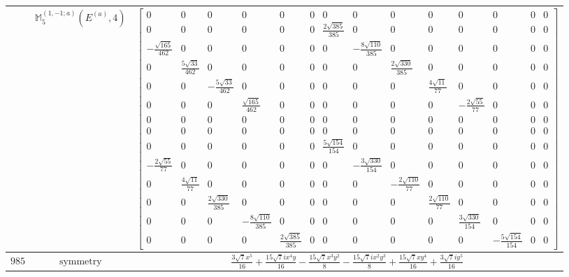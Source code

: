 \documentclass[fleqn,8pt,landscape]{jsarticle}
\begin{document}
\begin{longtable}{ccc}
$  $ & $ \mathbb{M}_{5}^{(1,-1;a)}(E^{(a)},4) $ & $ \begin{bmatrix} 0 & 0 & 0 & 0 & 0 & 0 & 0 & 0 & 0 & 0 & 0 & 0 & 0 & 0 \\ 0 & 0 & 0 & 0 & 0 & 0 & \frac{2 \sqrt{385}}{385} & 0 & 0 & 0 & 0 & 0 & 0 & 0 \\ - \frac{\sqrt{165}}{462} & 0 & 0 & 0 & 0 & 0 & 0 & - \frac{8 \sqrt{110}}{385} & 0 & 0 & 0 & 0 & 0 & 0 \\ 0 & \frac{5 \sqrt{33}}{462} & 0 & 0 & 0 & 0 & 0 & 0 & \frac{2 \sqrt{330}}{385} & 0 & 0 & 0 & 0 & 0 \\ 0 & 0 & - \frac{5 \sqrt{33}}{462} & 0 & 0 & 0 & 0 & 0 & 0 & \frac{4 \sqrt{11}}{77} & 0 & 0 & 0 & 0 \\ 0 & 0 & 0 & \frac{\sqrt{165}}{462} & 0 & 0 & 0 & 0 & 0 & 0 & - \frac{2 \sqrt{55}}{77} & 0 & 0 & 0 \\ 0 & 0 & 0 & 0 & 0 & 0 & 0 & 0 & 0 & 0 & 0 & 0 & 0 & 0 \\ 0 & 0 & 0 & 0 & 0 & 0 & 0 & 0 & 0 & 0 & 0 & 0 & 0 & 0 \\ 0 & 0 & 0 & 0 & 0 & 0 & \frac{5 \sqrt{154}}{154} & 0 & 0 & 0 & 0 & 0 & 0 & 0 \\ - \frac{2 \sqrt{55}}{77} & 0 & 0 & 0 & 0 & 0 & 0 & - \frac{3 \sqrt{330}}{154} & 0 & 0 & 0 & 0 & 0 & 0 \\ 0 & \frac{4 \sqrt{11}}{77} & 0 & 0 & 0 & 0 & 0 & 0 & - \frac{2 \sqrt{110}}{77} & 0 & 0 & 0 & 0 & 0 \\ 0 & 0 & \frac{2 \sqrt{330}}{385} & 0 & 0 & 0 & 0 & 0 & 0 & \frac{2 \sqrt{110}}{77} & 0 & 0 & 0 & 0 \\ 0 & 0 & 0 & - \frac{8 \sqrt{110}}{385} & 0 & 0 & 0 & 0 & 0 & 0 & \frac{3 \sqrt{330}}{154} & 0 & 0 & 0 \\ 0 & 0 & 0 & 0 & \frac{2 \sqrt{385}}{385} & 0 & 0 & 0 & 0 & 0 & 0 & - \frac{5 \sqrt{154}}{154} & 0 & 0 \end{bmatrix} $ \\ \hline
$ 985 $ & $ \text{symmetry} $ & $ \frac{3 \sqrt{7} x^{5}}{16} + \frac{15 \sqrt{7} i x^{4} y}{16} - \frac{15 \sqrt{7} x^{3} y^{2}}{8} - \frac{15 \sqrt{7} i x^{2} y^{3}}{8} + \frac{15 \sqrt{7} x y^{4}}{16} + \frac{3 \sqrt{7} i y^{5}}{16} $ \\

\end{longtable}
\end{document}
